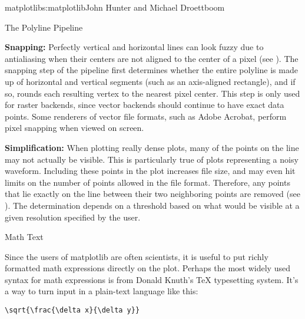 \begin{aosachapter}{matplotlib}{s:matplotlib}{John Hunter and Michael Droettboom}
\begin{aosasect1}{The Polyline Pipeline}
\begin{aosaitemize}
\item \textbf{Snapping:} Perfectly vertical and horizontal lines can
  look fuzzy due to antialiasing when their centers are not aligned to
  the center of a pixel (see
  ).  The snapping step of
  the pipeline first determines whether the entire polyline is made up
  of horizontal and vertical segments (such as an axis-aligned
  rectangle), and if so, rounds each resulting vertex to the nearest
  pixel center.  This step is only used for raster backends, since
  vector backends should continue to have exact data points.  Some
  renderers of vector file formats, such as Adobe Acrobat, perform
  pixel snapping when viewed on screen.

\item \textbf{Simplification:} When plotting really dense plots, many
  of the points on the line may not actually be visible.  This is
  particularly true of plots representing a noisy waveform.  Including
  these points in the plot increases file size, and may even hit
  limits on the number of points allowed in the file format.
  Therefore, any points that lie exactly on the line between their two
  neighboring points are removed (see
  ).  The determination
  depends on a threshold based on what would be visible at a given
  resolution specified by the user.


\end{aosaitemize}

\end{aosasect1}

\begin{aosasect1}{Math Text}

Since the users of matplotlib are often scientists, it is useful to
put richly formatted math expressions directly on the plot.  Perhaps
the most widely used syntax for math expressions is from Donald
Knuth's TeX typesetting system.  It's a way to turn input in a
plain-text language like this: 

\begin{verbatim}
\sqrt{\frac{\delta x}{\delta y}}
\end{verbatim}


\end{aosasect1}
\end{aosachapter}
